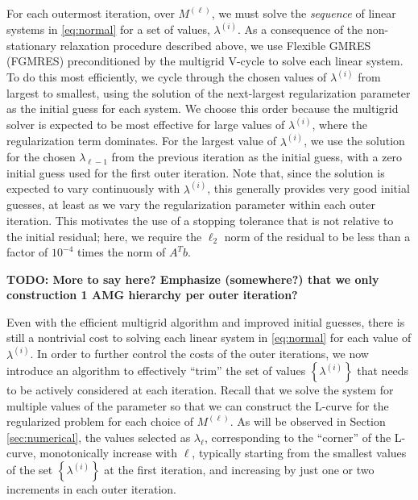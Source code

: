 
For each outermost iteration, over $M^{(\ell)}$, we must solve the
\textit{sequence} of linear systems in \eqref{eq:normal} for a set of
values, $\lambda^{(i)}$.  As a consequence of the non-stationary
relaxation procedure described above, we use Flexible GMRES
(FGMRES) \cite{YSaad_2003a} preconditioned by the multigrid V-cycle to
solve each linear system.  To do this most efficiently, we cycle
through the chosen values of $\lambda^{(i)}$ from largest to smallest,
using the solution of the next-largest regularization parameter as the
initial guess for each system.  We choose this order because the
multigrid solver is expected to be most effective for large values of
$\lambda^{(i)}$, where the regularization term dominates.  For the
largest value of $\lambda^{(i)}$, we use the solution for the chosen
$\lambda_{\ell-1}$ from the previous iteration as the initial guess,
with a zero initial guess used for the first outer iteration.  Note
that, since the solution is expected to vary continuously with
$\lambda^{(i)}$, this generally provides very good initial guesses, at
least as we vary the regularization parameter within each outer
iteration.  This motivates the use of a stopping tolerance that is not
relative to the initial residual; here, we require the $\ell_2$ norm
of the residual to be less than a factor of $10^{-4}$ times the norm
of $A^Tb$.

{\bf TODO: More to say here? Emphasize (somewhere?) that we only
  construction 1 AMG hierarchy per outer iteration?}

Even with the efficient multigrid algorithm and improved initial
guesses, there is still a nontrivial cost to solving each linear
system in \eqref{eq:normal} for each value of $\lambda^{(i)}$.  In
order to further control the costs of the outer iterations, we now
introduce an algorithm to effectively ``trim'' the set of values
$\left\{\lambda^{(i)}\right\}$ that needs to be actively considered at
each iteration.  Recall that we solve the system for multiple values
of the parameter so that we can construct the L-curve for the
regularized problem for each choice of $M^{(\ell)}$.  As will be
observed in Section \ref{sec:numerical}, the values selected as
$\lambda_\ell$, corresponding to the ``corner'' of the L-curve,
monotonically increase with $\ell$, typically starting from the
smallest values of the set $\left\{\lambda^{(i)}\right\}$ at the first
iteration, and increasing by just one or two increments in each outer
iteration.

